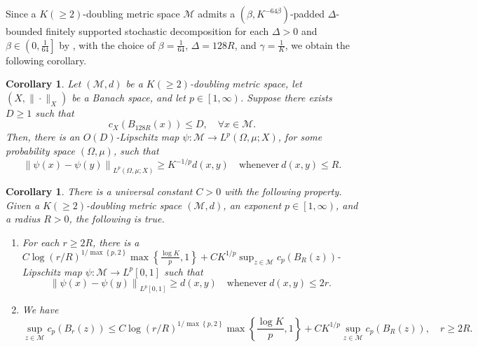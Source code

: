 \documentclass[11pt,reqno]{amsart}
\newtheorem{corollary}[theorem]{Corollary}
\newcommand{\1}{\mathbf 1}
\begin{document}
Since a $K(\ge 2)$-doubling metric space $\mathcal{M}$ admits a $\left(\beta,K^{-64\beta}\right)$-padded $\Delta$-bounded finitely supported stochastic decomposition for each $\Delta>0$ and $\beta\in \left(0,\frac{1}{64}\right]$ by \cite[Lemma 2.2]{naor2012assouad}, with the choice of $\beta=\frac 1{64}$, $\Delta=128R$, and $\gamma=\frac 1K$, we obtain the following corollary.
\begin{corollary}\label{cor:doubling-loc-ext}
    Let $\left(\mathcal{M},d\right)$ be a $K(\ge 2)$-doubling metric space, let $\left(X,\|\cdot\|_X\right)$ be a Banach space, and let $p\in \left[1,\infty\right)$.
Suppose there exists $D\ge 1$ such that
    \[
    c_X\left(B_{128R}\left(x\right)\right)\le D,\quad \forall x\in \mathcal{M}.
    \]
    Then, there is an $O(D)$-Lipschitz map $\psi:\mathcal{M}\to L^p\left(\Omega,\mu;X\right)$, for some probability space $\left(\Omega,\mu\right)$, such that
    \[
\left\|\psi\left(x\right)-\psi\left(y\right)\right\|_{L^p\left(\Omega,\mu;X\right)}\ge K^{-1/p} d\left(x,y\right) \quad \mathrm{whenever}~d\left(x,y\right)\le R.
\]
\end{corollary}
\begin{corollary}\label{cor:doubling-loc-emb}
There is a universal constant $C>0$ with the following property. Given a $K(\ge 2)$-doubling metric space $\left(\mathcal{M},d\right)$, an exponent $p\in \left[1,\infty\right)$, and a radius $R>0$, the following is true.
\begin{enumerate}
\item For each $r\ge 2R$, there is a $C\log\left(r/R\right)^{1/\max\left\{p,2\right\}}\max\left\{\frac{\log K}{p},1\right\}+CK^{1/p}\sup_{ z\in \mathcal{M}}c_p\left(B_{R}\left(z\right)\right)$-Lipschitz map $\psi:\mathcal{M}\to L^p[0,1]$ such that
\[
\left\|\psi\left(x\right)-\psi\left(y\right)\right\|_{L^p[0,1]}\ge d\left(x,y\right) \quad \mathrm{whenever}~d\left(x,y\right)\le 2r.
\]
\item We have
    \[
\sup_{ z\in \mathcal{M}}c_p\left(B_{r}\left(z\right)\right)\le    C\log\left(r/R\right)^{1/\max\left\{p,2\right\}}\max\left\{\frac{\log K}{p},1\right\}+CK^{1/p}\sup_{ z\in \mathcal{M}}c_p\left(B_{R}\left(z\right)\right),\quad r\ge 2R.
    \]
\end{enumerate}
\end{corollary}
\end{document}
